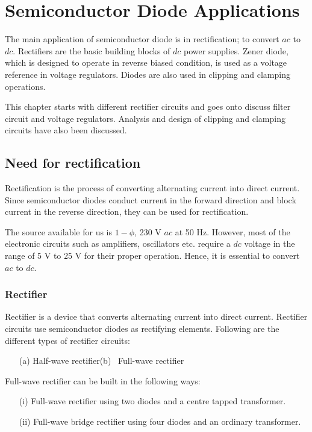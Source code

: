 \chapter{Semiconductor Diode Applications}\label{chap2}

The main application of semiconductor diode is in rectification; to convert $ac$ to $dc$. Rectifiers are the basic building blocks of $dc$ power supplies. Zener diode, which is designed to operate in reverse biased condition, is used as a voltage reference in voltage regulators. Diodes are also used in clipping and clamping operations.

This chapter starts with different rectifier circuits and goes onto discuss filter circuit and voltage regulators. Analysis and design of clipping and clamping circuits have also been discussed.\\[-.7cm]

\section{Need for rectification}\label{sec2.1}

Rectification is the process of converting alternating current into
direct current. Since semiconductor diodes conduct current in the
forward direction and block current in the reverse direction, they can
be used for rectification.

The source available for us is $1-\phi$, 230 V $ac$ at 50 Hz. However,
most of the electronic circuits such as amplifiers, oscillators
etc. require a $dc$ voltage in the range of 5 V to 25 V for their
proper operation. Hence, it is essential to convert $ac$ to $dc$.\\[-.7cm]

\subsection{Rectifier}\label{subsec2.1.1}

Rectifier is a device that converts alternating current into direct
current. Rectifier circuits use semiconductor diodes as rectifying
elements. Following are the different types of rectifier circuits:
\begin{itemize}
\item[(a)] Half-wave rectifier\qquad (b)~ Full-wave rectifier
\end{itemize}

Full-wave rectifier can be built in the following ways:
\begin{itemize}
\itemsep=0pt
\item[(i)] Full-wave rectifier using two diodes and a centre tapped transformer.

\item[(ii)] Full-wave bridge rectifier using four diodes and an
  ordinary transformer.
\end{itemize}

